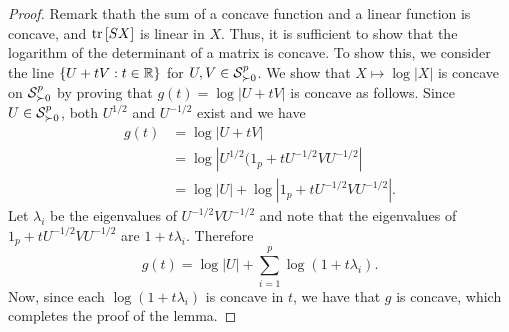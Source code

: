 \begin{proof}
    Remark thath the sum of a concave function and a linear function is concave, and $\trB{SX}$ is linear in $X$. Thus, it is sufficient to show that the logarithm of the determinant of a matrix is concave. To show this, we consider the line $\eset{ U + tV : t \in \R }$ for $U, V \in \S^p_{\succ 0}$. We show that $X \mapsto \log |X|$ is concave on $\S^p_{\succ 0}$ by proving that $g(t) = \log |U + tV|$ is concave as follows. Since $U \in \S^p_{\succ 0}$, both $U^{1/2}$ and $U^{-1/2}$ exist and we have 
    \begin{align*}
        g(t)
        &= \log |U + tV| \\
        &= \log |U^{1/2}(1_p + tU^{-1/2}VU^{-1/2}|\\
        &= \log |U| + \log |1_p + tU^{-1/2}VU^{-1/2}|.
    \end{align*}
    Let $\lambda_i$ be the eigenvalues of $U^{-1/2}VU^{-1/2}$ and note that the eigenvalues of $1_p + tU^{-1/2}VU^{-1/2}$ are $1 + t\lambda_i$. Therefore
    \begin{equation*}
        g(t) = \log |U| + \sum_{i=1}^p \log (1 + t\lambda_i).
    \end{equation*}
    Now, since each $\log (1 + t\lambda_i)$ is concave in $t$, we have that $g$ is concave, which completes the proof of the lemma.
\end{proof}

